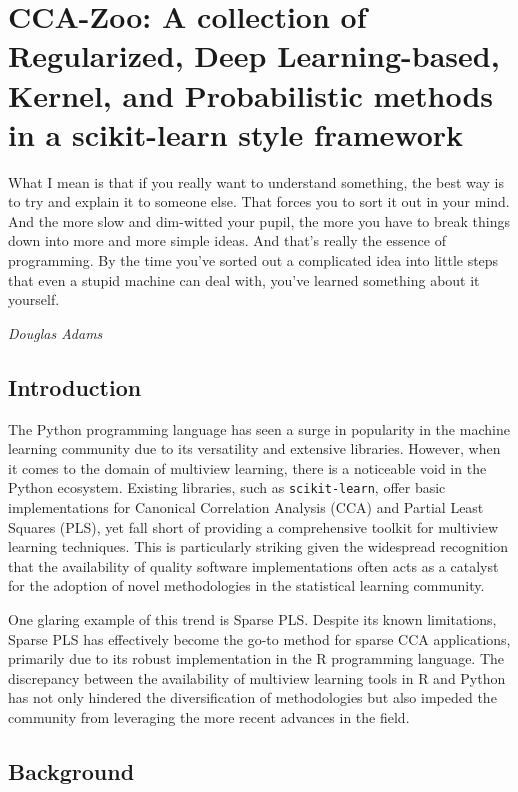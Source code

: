 \chapter{CCA-Zoo: A collection of Regularized, Deep Learning-based, Kernel, and Probabilistic methods in a scikit-learn style framework}\label{ch:ccazoo}

\epigraph{What I mean is that if you really want to understand something, the best way is to try and explain it to someone else. That forces you to sort it out in your mind. And the more slow and dim-witted your pupil, the more you have to break things down into more and more simple ideas. And that's really the essence of programming. By the time you've sorted out a complicated idea into little steps that even a stupid machine can deal with, you've learned something about it yourself.}{\textit{Douglas Adams}}

\section{Introduction}

The Python programming language has seen a surge in popularity in the machine learning community due to its versatility and extensive libraries.
However, when it comes to the domain of multiview learning, there is a noticeable void in the Python ecosystem.
Existing libraries, such as \texttt{scikit-learn}\cite{pedregosa2011scikit}, offer basic implementations for Canonical Correlation Analysis (CCA) and Partial Least Squares (PLS), yet fall short of providing a comprehensive toolkit for multiview learning techniques.
This is particularly striking given the widespread recognition that the availability of quality software implementations often acts as a catalyst for the adoption of novel methodologies in the statistical learning community.

One glaring example of this trend is Sparse PLS. Despite its known limitations, Sparse PLS has effectively become the go-to method for sparse CCA applications, primarily due to its robust implementation in the R programming language.
The discrepancy between the availability of multiview learning tools in R and Python has not only hindered the diversification of methodologies but also impeded the community from leveraging the more recent advances in the field.

\section{Background}

